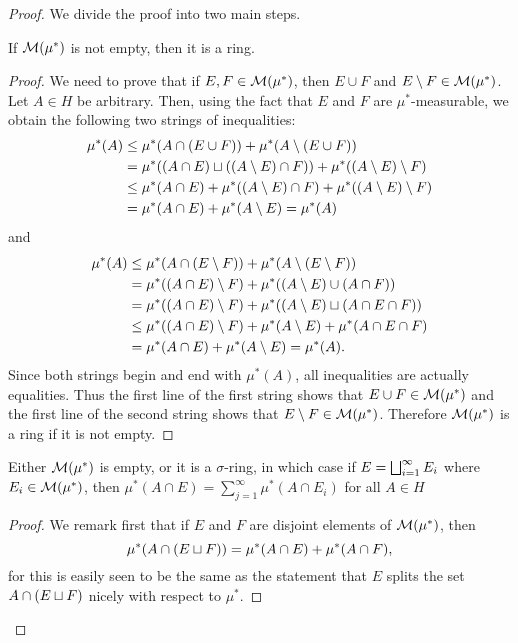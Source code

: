 \begin{proof}

We divide the proof into two main steps.

\begin{lemma}
If ${\cal M}(\mu^*)$ is not empty, then it is a ring.
\end{lemma}
\begin{proof}
We need to prove that if $E,F\in{\cal M}(\mu^*)$, then $E\cup F$ and $E\setminus F\in{\cal M}(\mu^*)$. Let $A\in H$ be arbitrary. Then, using the fact that $E$ and $F$ are $\mu^*$-measurable, we obtain the following two strings of inequalities:
\begin{align*}
    \mu^*(A)&\leq\mu^*(A\cap(E\cup F))+\mu^*(A\setminus(E\cup F)) \\
            &=\mu^*((A\cap E)\sqcup((A\setminus E)\cap F))+\mu^*((A\setminus E)\setminus F) \\
            &\leq\mu^*(A\cap E)+\mu^*((A\setminus E)\cap F)+\mu^*((A\setminus E)\setminus F) \\
            &=\mu^*(A\cap E)+\mu^*(A\setminus E)=\mu^*(A)
\end{align*}
and
\begin{align*}
    \mu^*(A)&\leq\mu^*(A\cap(E\setminus F))+\mu^*(A\setminus (E\setminus F)) \\
            &=\mu^*((A\cap E)\setminus F)+\mu^*((A\setminus E)\cup(A\cap F)) \\
            &=\mu^*((A\cap E)\setminus F)+\mu^*((A\setminus E)\sqcup(A\cap E\cap F)) \\
            &\leq\mu^*((A\cap E)\setminus F)+\mu^*(A\setminus E)+\mu^*(A\cap E\cap F) \\
            &=\mu^*(A\cap E)+\mu^*(A\setminus E)=\mu^*(A) .
\end{align*}
Since both strings begin and end with $\mu^*(A)$, all inequalities are actually equalities. Thus the first line of the first string shows that $E\cup F\in{\cal M}(\mu^*)$ and the first line of the second string shows that $E\setminus F\in{\cal M}(\mu^*)$. Therefore ${\cal M}(\mu^*)$ is a ring if it is not empty.
\end{proof}

\begin{lemma}\label{lem:outer measure sigma additivity}
Either ${\cal M}(\mu^*)$ is empty, or it is a $\sigma$-ring, in which case if $E=\bigsqcup_{i=1}^\infty E_i$ where $E_i\in{\cal M}(\mu^*)$, then $\mu^*(A\cap E)=\sum_{j=1}^\infty\mu^*(A\cap E_i)$ for all $A\in H$
\end{lemma}
\begin{proof}
We remark first that if $E$ and $F$ are disjoint elements of ${\cal M}(\mu^*)$, then \[\mu^*(A\cap(E\sqcup F))=\mu^*(A\cap E)+\mu^*(A\cap F),\] for this is easily seen to be the same as the statement that $E$ splits the set $A\cap(E\sqcup F)$ nicely with respect to $\mu^*$.


\end{proof}
\end{proof}
